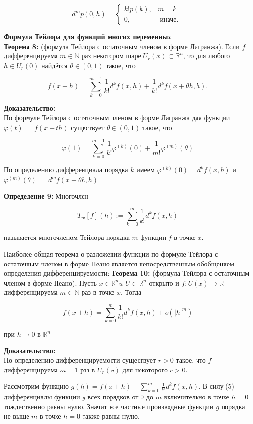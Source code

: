 \documentclass[a4paper,12pt]{article} %
\begin{document}
$$
d^{m} p(0, h)= \begin{cases}k ! p(h), & m=k \\ 0, & \text { иначе. }\end{cases}
$$

\textbf{Формула Тейлора для функций многих переменных}\\
\textbf{Теорема 8:} (формула Тейлора с остаточным членом в форме Лагранжа). Если $f$ дифференцируема $m \in \mathbb{N}$ раз некотором шаре $U_{r}(x) \subset \mathbb{R}^{n}$, то для любого $h \in U_{r}(0)$ найдётся $\theta \in(0,1)$ такое, что

$$
f(x+h)=\sum_{k=0}^{m-1} \frac{1}{k !} d^{k} f(x, h)+\frac{1}{k !} d^{k} f(x+\theta h, h) .
$$

\textbf{Доказательство:}\\
По формуле Тейлора с остаточным членом в форме Лагранжа для функции $\varphi(t)=$ $f(x+t h)$ существует $\theta \in(0,1)$ такое, что

$$
\varphi(1)=\sum_{k=0}^{m-1} \frac{1}{k !} \varphi^{(k)}(0)+\frac{1}{m !} \varphi^{(m)}(\theta)
$$

По определению дифференциала порядка $k$ имеем $\varphi^{(k)}(0)=d^{k} f(x, h)$ и $\varphi^{(m)}(\theta)=$ $d^{m} f(x+\theta h, h)$

\textbf{Определение 9:} Многочлен

$$
T_{m}[f](h):=\sum_{k=0}^{m} \frac{1}{k !} d^{k} f(x, h)
$$

называется многочленом Тейлора порядка $m$ функции $f$ в точке $x$.

Наиболее общая теорема о разложении функции по формуле Тейлора с остаточным членом в форме Пеано является непосредственным обобщением определения дифференцируемости: \textbf{Теорема 10:} (формула Тейлора с остаточным членом в форме Пеано). Пусть $x \in \mathbb{R}^{n} u$ $U \subset \mathbb{R}^{n}$ открыто и $f: U(x) \rightarrow \mathbb{R}$ дифференцируема $m \in \mathbb{N}$ раз в точке $x$. Тогда

$$
f(x+h)=\sum_{k=0}^{m} \frac{1}{k !} d^{k} f(x, h)+o\left(|h|^{m}\right)
$$

при $h \rightarrow 0$ в $\mathbb{R}^{n}$

\textbf{Доказательство:}\\
По определению дифференцируемости существует $r>0$ такое, что $f$ дифференцируема $m-1$ раз в $U_{r}(x)$ для некоторого $r>0$.

Рассмотрим функцию $g(h)=f(x+h)-\sum_{k=0}^{m} \frac{1}{k !} d^{k} f(x, h)$. В силу (5) дифференциалы функции $g$ всех порядков от 0 до $m$ включительно в точке $h=0$ тождественно равны нулю. Значит все частные производные функции $g$ порядка не выше $m$ в точке $h=0$ также равны нулю.
\end{document}
